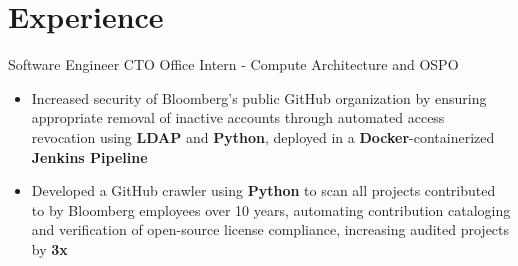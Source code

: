 \documentclass[letterpaper,11pt]{article}
\begin{document}
\section{Experience}
{Software Engineer}{}
{CTO Office Intern - Compute Architecture and OSPO}{}
\begin{itemize}[leftmargin=*]
    \item \vspace{-3pt} \small Increased security of Bloomberg's public GitHub
          organization by ensuring appropriate removal of inactive accounts
          through automated access revocation using \textbf{LDAP} and
          \textbf{Python}, deployed in a \textbf{Docker}-containerized
          \textbf{Jenkins Pipeline}
    \item \vspace{-7pt} \small Developed a GitHub crawler using \textbf{Python}
          to scan
          all projects contributed to by Bloomberg employees over 10 years,
          automating contribution cataloging and
          verification of open-source license compliance,
          increasing audited projects by \textbf{3x}
\end{itemize}
\end{document}
